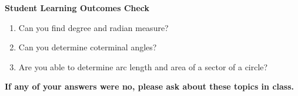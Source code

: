 \noindent \textbf{Student Learning Outcomes Check}

\begin{enumerate}
\item Can you find degree and radian measure?
\item Can you determine coterminal angles?
\item Are you able to determine arc length and area of a sector of a circle?
\end{enumerate}

\noindent \textbf{If any of your answers were no, please ask about these topics in class.}

